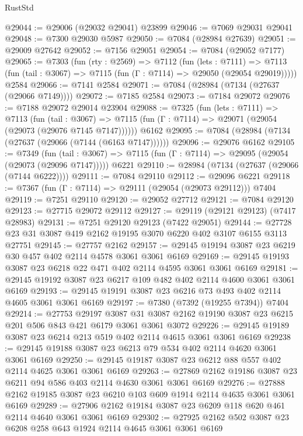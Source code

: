 \begin{lexlean}{RustStd}
\begin{coremodule}
@29044 := @29006 (@29032 @29041) @23899
@29046 := @7069 @29031 @29041
@29048 := @7300 @29030 @5987
@29050 := @7084 (@28984 @27639)
@29051 := @29009 @27642
@29052 := @7156 @29051
@29054 := @7084 (@29052 @7177)
@29065 := @7303
    (fun (rty : @2569) =>
    @7112
      (fun (lets : @7111) =>
      @7113 (fun (tail : @3067) => @7115 (fun (Γ : @7114) => @29050 (@29054 @29019)))))
    @2584
@29066 := @7141 @2584
@29071 := @7084 (@28984 (@7134 (@27637 (@29066 @7149))))
@29072 := @7185 @2584
@29073 := @7184 @29072
@29076 := @7188 @29072 @29014 @23904
@29088 := @7325
    (fun (lets : @7111) =>
    @7113
      (fun (tail : @3067) =>
      @7115 (fun (Γ : @7114) => @29071 (@29054 (@29073 (@29076 @7145 @7147))))))
    @6162
@29095 := @7084 (@28984 (@7134 (@27637 (@29066 (@7144 (@6163 @7147))))))
@29096 := @29076 @6162
@29105 := @7349
    (fun (tail : @3067) => @7115 (fun (Γ : @7114) => @29095 (@29054 (@29073 (@29096 @7147)))))
    @6221
@29110 := @28984 (@7134 (@27637 (@29066 (@7144 @6222))))
@29111 := @7084 @29110
@29112 := @29096 @6221
@29118 := @7367 (fun (Γ : @7114) => @29111 (@29054 (@29073 @29112))) @7404
@29119 := @7251 @29110
@29120 := @29052 @27712
@29121 := @7084 @29120
@29123 := @27715 @29072 @29112
@29127 := @29119 (@29121 @29123) (@7417 @28983)
@29131 := @7251 @29120 @29123 (@7422 @29051)
@29144 := @27728 @23 @31 @3087 @419 @2162 @19195 @3070 @6220 @402 @3107 @6155 @3113 @27751
@29145 := @27757 @2162
@29157 := @29145 @19194 @3087 @23 @6219 @30 @457 @402 @2114 @4578 @3061 @3061 @6169
@29169 := @29145 @19193 @3087 @23 @6218 @22 @471 @402 @2114 @4595 @3061 @3061 @6169
@29181 := @29145 @19192 @3087 @23 @6217 @109 @482 @402 @2114 @4600 @3061 @3061 @6169
@29193 := @29145 @19191 @3087 @23 @6216 @73 @493 @402 @2114 @4605 @3061 @3061 @6169
@29197 := @7380 (@7392 (@19255 @7394)) @7404
@29214 := @27753
    @29197
    @3087
    @31
    @3087
    @2162
    @19190
    @3087
    @23
    @6215
    @201
    @506
    @843
    @421
    @6179
    @3061
    @3061
    @3072
@29226 := @29145 @19189 @3087 @23 @6214 @213 @519 @402 @2114 @4615 @3061 @3061 @6169
@29238 := @29145 @19188 @3087 @23 @6213 @79 @534 @402 @2114 @4620 @3061 @3061 @6169
@29250 := @29145 @19187 @3087 @23 @6212 @88 @557 @402 @2114 @4625 @3061 @3061 @6169
@29263 := @27869 @2162 @19186 @3087 @23 @6211 @94 @586 @403 @2114 @4630 @3061 @3061 @6169
@29276 := @27888 @2162 @19185 @3087 @23 @6210 @103 @609 @1914 @2114 @4635 @3061 @3061 @6169
@29289 := @27906 @2162 @19184 @3087 @23 @6209 @118 @620 @461 @2114 @4640 @3061 @3061 @6169
@29302 := @27925 @2162 @502 @3087 @23 @6208 @258 @643 @1924 @2114 @4645 @3061 @3061 @6169

\end{coremodule}
\end{lexlean}
